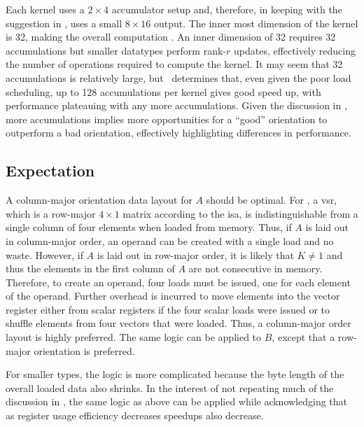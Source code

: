 \documentclass[\main/thesis.tex]{subfiles}
\begin{document}
Each kernel uses a $2 \times 4$ accumulator setup and, therefore, in keeping with the suggestion in , uses a small $8 \times 16$ output.
The inner most dimension of the kernel is 32, making the overall computation .
An inner dimension of 32 requires 32 accumulations but smaller datatypes perform rank-$r$ updates, effectively reducing the number of operations required to compute the kernel.
It may seem that 32 accumulations is relatively large, but~\autocite{kuzma2021fast} determines that, even given the poor load scheduling, up to 128 accumulations per kernel gives good speed up, with performance plateauing with any more accumulations.
Given the discussion in , more accumulations implies more opportunities for a ``good'' orientation to outperform a bad orientation, effectively highlighting differences in performance.

\subsection{Expectation}
\label{sec:orderExpectation}
A column-major orientation data layout for $A$ should be optimal.
For , a \gls{vsr}, which is a row-major $4 \times 1$ matrix according to the \gls{isa}, is indistinguishable from a single column of four elements when loaded from memory.
Thus, if $A$ is laid out in column-major order, an operand can be created with a single load and no waste.
However, if $A$ is laid out in row-major order, it is likely that $K \ne 1$ and thus the elements in the first column of $A$ are not consecutive in memory.
Therefore, to create an operand, four loads must be issued, one for each element of the operand.
Further overhead is incurred to move elements into the vector register either from scalar registers if the four scalar loads were issued or to shuffle elements from four vectors that were loaded.
Thus, a column-major order layout is highly preferred.
The same logic can be applied to $B$, except that a row-major orientation is preferred.

For smaller types, the logic is more complicated because the byte length of the overall loaded data also shrinks.
In the interest of not repeating much of the discussion in , the same logic as above can be applied while acknowledging that as register usage efficiency decreases speedups also decrease.
\end{document}
